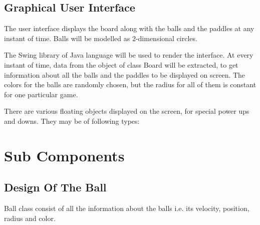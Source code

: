 \documentclass{article}
\begin{document}
    	\subsection{Graphical User Interface}
    	The user interface displays the board along with the balls and the paddles at any instant of time. Balls will be modelled as 2-dimensional circles.
    	\par\noindent The Swing library of Java language will be used to render the interface. At every instant of time, data from the object of class Board will be extracted, to get information about all the balls and the paddles to be displayed on screen. The colors for the balls are randomly chosen, but the radius for all of them is constant for one particular game. 
    	\par\noindent There are various floating objects displayed on the screen, for special power ups and downs. They may be of following types:



	\section{Sub Components}
\subsection{Design Of The Ball} Ball class consist of all the information about the balls i.e. its velocity, position, radius and color.
\end{document}
